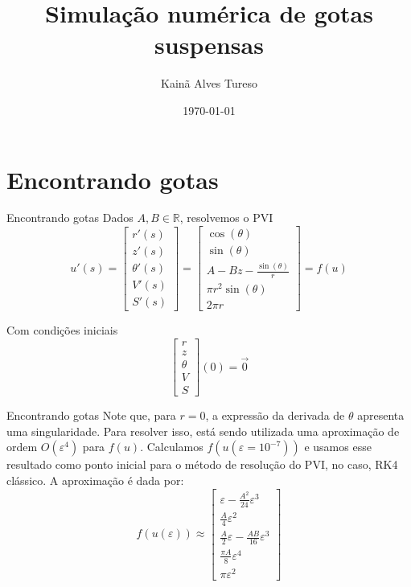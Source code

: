 \documentclass{beamer}
\author{Kainã Alves Tureso}
\title{Simulação numérica de gotas suspensas}
\date{\today}
\institute{ICMC-USP}
\begin{document}
\frame{\titlepage}
\frame{
    \tableofcontents
}

\section{Encontrando gotas}
\begin{frame}{Encontrando gotas}
    Dados $A, B \in \mathbb{R}$, resolvemos o PVI
    \[
        u'(s) = \begin{bmatrix}
            r'(s) \\ z'(s) \\ \theta'(s) \\ V'(s) \\ S'(s)
        \end{bmatrix} = \begin{bmatrix}
            \cos(\theta) \\
            \sin(\theta) \\
            A - Bz - \frac{\sin(\theta)}{r} \\
            \pi r^2 \sin(\theta)  \\
            2\pi r
        \end{bmatrix} = f(u)
    \]

    Com condições iniciais
    \[
        \begin{bmatrix}
            r \\ z \\ \theta \\ V \\ S
        \end{bmatrix} (0) = \vec{0}
    \]
\end{frame}

\begin{frame}{Encontrando gotas}
    Note que, para $r = 0$, a expressão da derivada de $\theta$ apresenta uma singularidade. Para resolver isso, está sendo utilizada uma aproximação de ordem $O(\varepsilon^4)$ para $f(u)$. Calculamos $f(u(\varepsilon = 10^{-7}))$ e usamos esse resultado como ponto inicial para o método de resolução do PVI, no caso, RK4 clássico. A aproximação é dada por:
    \[
        f(u(\varepsilon)) \approx \begin{bmatrix}
            \varepsilon - \frac{A^2}{24}\varepsilon^3 \\
            \frac{A}{4} \varepsilon^2 \\
            \frac{A}{2} \varepsilon - \frac{AB}{16} \varepsilon^3\\
            \frac{\pi A}{8}\varepsilon^4 \\
            \pi \varepsilon^2
        \end{bmatrix}
    \]
\end{frame}
\end{document}
